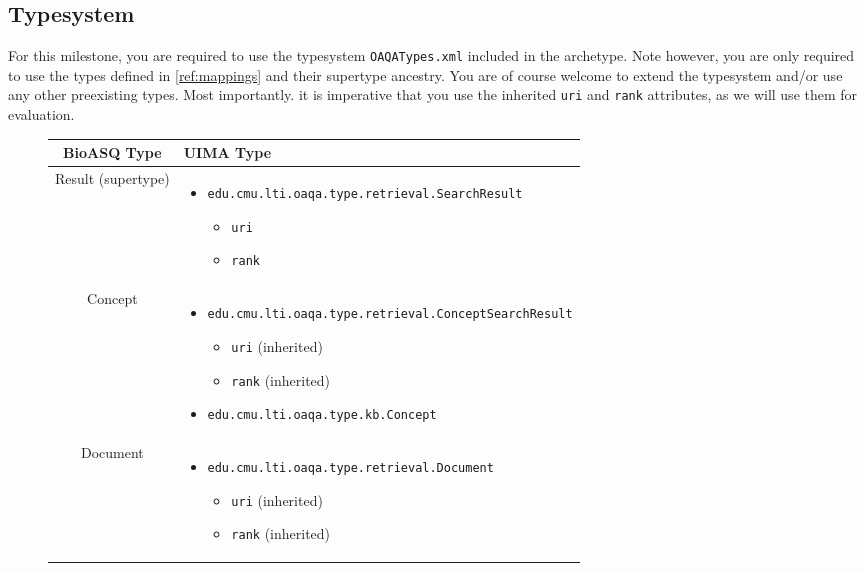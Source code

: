 \subsection{Typesystem}
For this milestone, you are required to use the typesystem \verb|OAQATypes.xml| included in the archetype. Note however, you are only required to use the types defined in \ref{ref:mappings} and their supertype ancestry. You are of course welcome to extend the typesystem and/or use any other preexisting types. Most importantly. it is imperative that you use the inherited \verb|uri| and \verb|rank| attributes, as we will use them for evaluation.
\begin{figure}[h!]
\begin{longtable}{c|P{6cm}}
\textbf{BioASQ Type} & \textbf{UIMA Type}\\\hline
Result (supertype) &   \begin{itemize} \item \verb|edu.cmu.lti.oaqa.type.retrieval.SearchResult| \begin{itemize} \item \verb|uri| \item \verb|rank| \end{itemize} \end{itemize} \\\hline
Concept & \begin{itemize} \item \verb|edu.cmu.lti.oaqa.type.retrieval.ConceptSearchResult| \begin{itemize} \item \verb|uri| (inherited) \item \verb|rank| (inherited) \end{itemize}  \item \verb|edu.cmu.lti.oaqa.type.kb.Concept| \end{itemize} \\\hline
Document & \begin{itemize} \item \verb|edu.cmu.lti.oaqa.type.retrieval.Document| \begin{itemize} \item \verb|uri| (inherited) \item \verb|rank| (inherited) \end{itemize} \end{itemize}  \\\hline

\end{longtable}
\end{figure}

